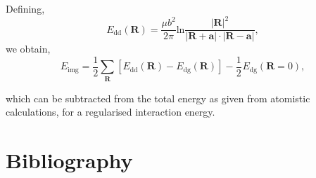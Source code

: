 \documentclass[a4paper,11pt]{article}
\begin{document}
Defining, 
 \[ E_{\text{dd}} (\mathbf{R}) = \frac{\mu b^2}{2\pi}
   \text{ln}\frac{|\mathbf{R}|^2}{|\mathbf{R}+\mathbf{a}|\cdot|\mathbf{R}-\mathbf{a}|},
   \]
we obtain,
\[ E_{\text{img}} = \frac{1}{2}\sum_{\mathbf{R}} [ E_{\text{dd}} (\mathbf{R}) - E_{\text{dg}} (\mathbf{R}) ] - \frac{1}{2}_{}
   E_{\text{dg}} (\mathbf{R} = 0),  \]

which can be subtracted from the total energy as given from atomistic calculations, for a
regularised interaction energy. 

\section{Bibliography}
\label{sec:org40a46ae}
\label{orgf305750}




\end{document}
